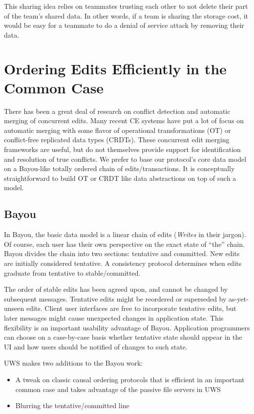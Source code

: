 \documentclass[runningheads]{llncs}
\begin{document}
This sharing idea relies on teammates trusting each other to not delete their part of the team's shared data.
In other words, if a team is sharing the storage cost, it would be easy for a teammate to do a denial of service attack by removing their data.

\section{Ordering Edits Efficiently in the Common Case}

There has been a great deal of research on conflict detection and automatic merging of concurrent edits.
Many recent CE systems have put a lot of focus on automatic merging with some flavor of operational transformations (OT) or conflict-free replicated data types (CRDTs).
These concurrent edit merging frameworks are useful, but do not themselves provide support for identification and resolution of true conflicts.
We prefer to base our protocol's core data model on a Bayou-like totally ordered chain of edits{\slash}transactions.
It is conceptually straightforward to build OT or CRDT like data abstractions on top of such a model.

\subsection{Bayou}

In Bayou, the basic data model is a linear chain of edits (\emph{Writes} in their jargon).
Of course, each user has their own perspective on the exact state of ``the'' chain.
Bayou divides the chain into two sections: tentative and committed.
New edits are initially considered tentative.
A consistency protocol determines when edits graduate from tentative to stable{\slash}committed.

The order of stable edits has been agreed upon, and cannot be changed by subsequent messages.
Tentative edits might be reordered or superseded by as-yet-unseen edits.
Client user interfaces are free to incorporate tentative edits, but later messages might cause unexpected changes in application state.
This flexibility is an important usability advantage of Bayou.
Application programmers can choose on a case-by-case basis whether tentative state should appear in the UI and how users should be notified of changes to such state.

UWS makes two additions to the Bayou work:

\begin{itemize}
\item A tweak on classic causal ordering protocols that is efficient in an important common case and takes advantage of the passive file servers in UWS
\item Blurring the tentative{\slash}committed line
\end{itemize}
\end{document}
